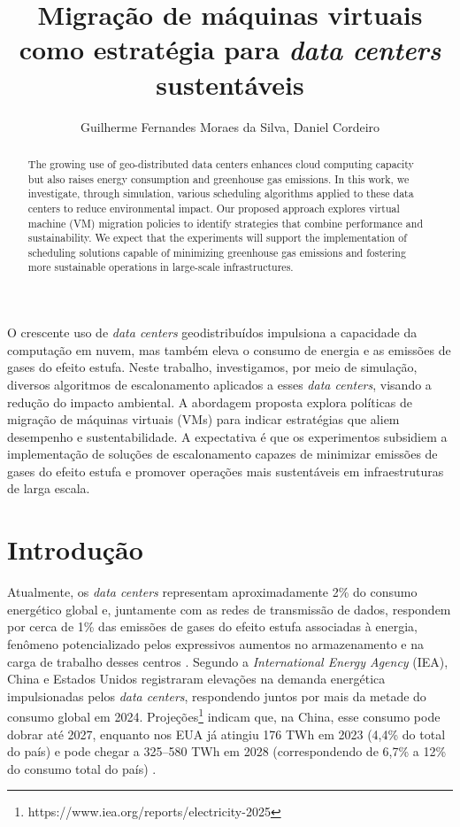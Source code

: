 \documentclass[12pt]{article}
\title{Migração de máquinas virtuais como estratégia para \textit{data centers} sustentáveis}
\author{Guilherme Fernandes Moraes da Silva\inst{1}, Daniel Cordeiro\inst{1}}
\begin{document}
 

\maketitle

\begin{abstract}
The growing use of geo-distributed data centers enhances cloud computing capacity but also raises energy consumption and greenhouse gas emissions. In this work, we investigate, through simulation, various scheduling algorithms applied to these data centers to reduce environmental impact. Our proposed approach explores virtual machine (VM) migration policies to identify strategies that combine performance and sustainability. We expect that the experiments will support the implementation of scheduling solutions capable of minimizing greenhouse gas emissions and fostering more sustainable operations in large-scale infrastructures.
\end{abstract}
     
\begin{resumo}
O crescente uso de \textit{data centers} geodistribuídos impulsiona a capacidade da computação em nuvem, mas também eleva o consumo de energia e as emissões de gases do efeito estufa. Neste trabalho, investigamos, por meio de simulação, diversos algoritmos de escalonamento aplicados a esses \textit{data centers}, visando a redução do impacto ambiental. A abordagem proposta explora políticas de migração de máquinas virtuais (VMs) para indicar estratégias que aliem desempenho e sustentabilidade. A expectativa é que os experimentos subsidiem a implementação de soluções de escalonamento capazes de minimizar emissões de gases do efeito estufa e promover operações mais sustentáveis em infraestruturas de larga escala.
\end{resumo}


\section{Introdução}
Atualmente, os \textit{data centers} representam aproximadamente 2\% do consumo energético global e, juntamente com as redes de transmissão de dados, respondem por cerca de 1\% das emissões de gases do efeito estufa associadas à energia, fenômeno potencializado pelos expressivos aumentos no armazenamento e na carga de trabalho desses centros \cite{masanet:20}. Segundo a \textit{International Energy Agency} (IEA), China e Estados Unidos registraram elevações na demanda energética impulsionadas pelos \textit{data centers}, respondendo juntos por mais da metade do consumo global em 2024. Projeções\footnote{https://www.iea.org/reports/electricity-2025} indicam que, na China, esse consumo pode dobrar até 2027, enquanto nos EUA já atingiu 176 TWh em 2023 (4,4\% do total do país) e pode chegar a 325–580 TWh em 2028 (correspondendo de 6,7\% a 12\% do consumo total do país) \cite{shehabi:24}.
\end{document}
